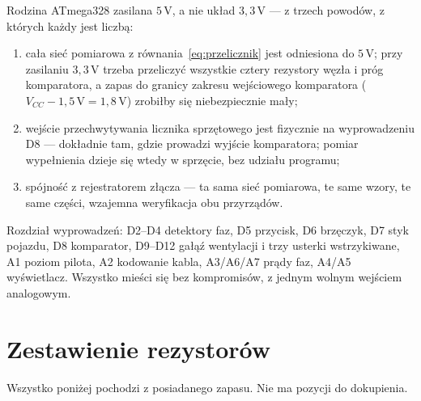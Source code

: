 \documentclass[a4paper,11pt]{article}
\newcommand{\volt}{\,\mathrm{V}}
\begin{document}
Rodzina ATmega328 zasilana $5\volt$, a nie układ $3{,}3\volt$ --- z trzech powodów,
z których każdy jest liczbą:

\begin{enumerate}
\item cała sieć pomiarowa z równania~\eqref{eq:przelicznik} jest odniesiona do
      $5\volt$; przy zasilaniu $3{,}3\volt$ trzeba przeliczyć wszystkie cztery
      rezystory węzła i próg komparatora, a zapas do granicy zakresu wejściowego
      komparatora ($V_{CC}-1{,}5\volt = 1{,}8\volt$) zrobiłby się niebezpiecznie
      mały;
\item wejście przechwytywania licznika sprzętowego jest fizycznie na wyprowadzeniu
      D8 --- dokładnie tam, gdzie prowadzi wyjście komparatora; pomiar wypełnienia
      dzieje się wtedy w sprzęcie, bez udziału programu;
\item spójność z rejestratorem złącza --- ta sama sieć pomiarowa, te same wzory,
      te same części, wzajemna weryfikacja obu przyrządów.
\end{enumerate}

Rozdział wyprowadzeń: D2--D4 detektory faz, D5 przycisk, D6 brzęczyk, D7 styk
pojazdu, D8 komparator, D9--D12 gałąź wentylacji i trzy usterki wstrzykiwane,
A1 poziom pilota, A2 kodowanie kabla, A3/A6/A7 prądy faz, A4/A5 wyświetlacz.
Wszystko mieści się bez kompromisów, z jednym wolnym wejściem analogowym.

\section{Zestawienie rezystorów}
\label{sec:zestawienie}

Wszystko poniżej pochodzi z posiadanego zapasu. Nie ma pozycji do dokupienia.
\end{document}
